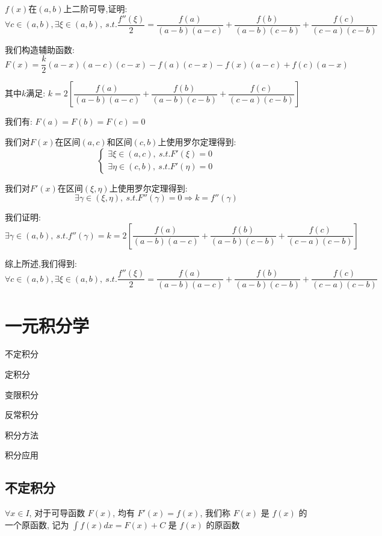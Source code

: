 
\begin{proposition}
	$f(x)$在$(a,b)$上二阶可导,证明: $$\forall c\in(a,b),\exists\xi\in(a,b),\ s.t. \dfrac{f''(\xi)}{2}=\dfrac{f(a)}{(a-b)(a-c)}+\dfrac{f(b)}{(a-b)(c-b)}+\dfrac{f(c)}{(c-a)(c-b)}$$
\end{proposition}
\begin{solution}

	我们构造辅助函数: $F(x)=\dfrac{k}{2}(a-x)(a-c)(c-x)-f(a)(c-x)-f(x)(a-c)+f(c)(a-x)$

	其中$k$满足: $k=2[\dfrac{f(a)}{(a-b)(a-c)}+\dfrac{f(b)}{(a-b)(c-b)}+\dfrac{f(c)}{(c-a)(c-b)}]$

	我们有: $F(a)=F(b)=F(c)=0$

	我们对$F(x)$在区间$(a,c)$和区间$(c,b)$上使用罗尔定理得到:
	$$\left\lbrace
		\begin{array}{l}
			\exists \xi\in(a,c),\ s.t. F'(\xi)=0 \\
			\exists \eta\in(c,b),\ s.t. F'(\eta)=0
		\end{array}
		\right. $$

	我们对$F'(x)$在区间$(\xi,\eta)$上使用罗尔定理得到:
	$$\exists\gamma\in(\xi,\eta),\ s.t. F''(\gamma)=0\Rightarrow k=f''(\gamma)$$

	我们证明: $\exists \gamma\in(a,b),\ s.t. f''(\gamma)=k=2[\dfrac{f(a)}{(a-b)(a-c)}+\dfrac{f(b)}{(a-b)(c-b)}+\dfrac{f(c)}{(c-a)(c-b)}]$

	综上所述,我们得到: $$\forall c\in(a,b),\exists\xi\in(a,b),\ s.t. \dfrac{f''(\xi)}{2}=\dfrac{f(a)}{(a-b)(a-c)}+\dfrac{f(b)}{(a-b)(c-b)}+\dfrac{f(c)}{(c-a)(c-b)}$$
\end{solution}


\chapter{一元积分学}
\begin{introduction}
	\item 不定积分
	\item 定积分
	\item 变限积分
	\item 反常积分
	\item 积分方法
	\item 积分应用
\end{introduction}
\section{不定积分}
\begin{definition}[不定积分]
	$\forall x\in I$, 对于可导函数 $F(x)$, 均有 $F'(x) = f(x)$, 我们称 $F(x)$ 是 $f(x)$ 的一个原函数, 记为 $\int f(x)dx = F(x) + C$ 是 $f(x)$ 的原函数
\end{definition}

